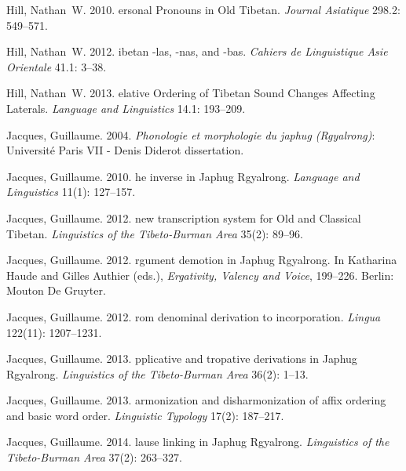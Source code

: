 \documentclass[oneside,a4paper,11pt]{article}
\begin{document}
\begin{thebibliography}{39}
Hill, Nathan~W. 2010{}.
ersonal {P}ronouns in {O}ld {T}ibetan.
\newblock \emph{Journal Asiatique} 298.2: 549--571.

Hill, Nathan~W. 2012.
ibetan -las, -nas, and -bas.
\newblock \emph{Cahiers de Linguistique Asie Orientale} 41.1: 3--38.

Hill, Nathan~W. 2013.
elative {O}rdering of {T}ibetan {S}ound {C}hanges {A}ffecting
  {L}aterals.
\newblock \emph{Language and Linguistics} 14.1: 193--209.

Jacques, Guillaume. 2004.
\newblock \emph{{P}honologie et morphologie du japhug ({R}gyalrong)}:
  Université Paris VII - Denis Diderot dissertation.

Jacques, Guillaume. 2010.
he inverse in {J}aphug {R}gyalrong.
\newblock \emph{Language and Linguistics} 11(1): 127--157.

Jacques, Guillaume. 2012{}.
 new transcription system for {O}ld and {C}lassical {T}ibetan.
\newblock \emph{Linguistics of the Tibeto-Burman Area} 35(2): 89--96.

Jacques, Guillaume. 2012{}.
rgument demotion in {J}aphug {R}gyalrong.
\newblock In Katharina Haude and Gilles Authier (eds.), \emph{{E}rgativity,
  {V}alency and {V}oice}, 199--226. Berlin: Mouton De Gruyter.

Jacques, Guillaume. 2012{}.
rom denominal derivation to incorporation.
\newblock \emph{Lingua} 122(11): 1207--1231.

Jacques, Guillaume. 2013{}.
pplicative and tropative derivations in {J}aphug {R}gyalrong.
\newblock \emph{Linguistics of the Tibeto-Burman Area} 36(2): 1--13.

Jacques, Guillaume. 2013{}.
armonization and disharmonization of affix ordering and basic word
  order.
\newblock \emph{Linguistic Typology} 17(2): 187–217.

Jacques, Guillaume. 2014{}.
lause linking in {J}aphug {R}gyalrong.
\newblock \emph{Linguistics of the Tibeto-Burman Area} 37(2): 263--327.


\end{thebibliography}
\end{document}

